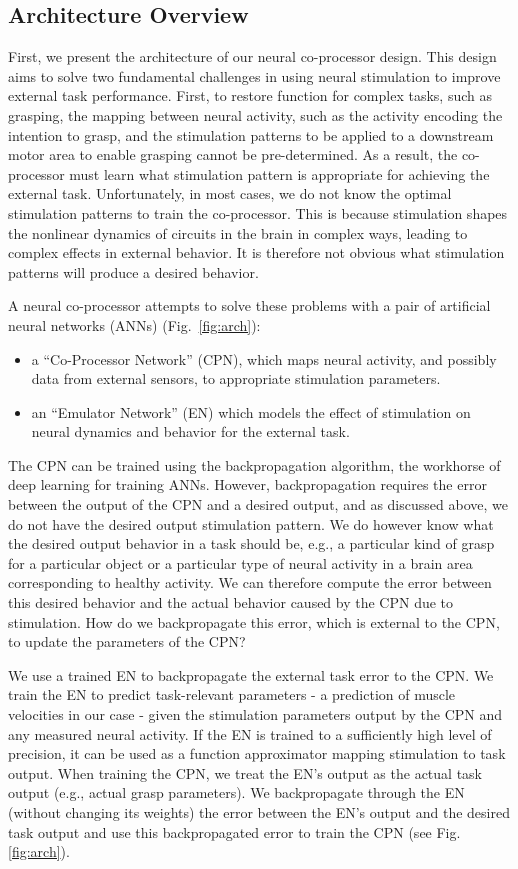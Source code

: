 \documentclass[12pt]{iopart}
\begin{document}
\subsection{Architecture Overview}
First, we present the architecture of our neural co-processor design. This design aims to solve two
fundamental challenges in using neural stimulation to improve external task performance.
First, to restore function for complex tasks, such as grasping, the mapping between
neural activity, such as the activity encoding the intention to grasp, and the stimulation patterns
to be applied to a downstream motor area to enable grasping cannot be pre-determined.
As a result, the co-processor must learn what stimulation pattern is appropriate for achieving the
external task. Unfortunately, in most cases, we do not know the optimal stimulation patterns to train
the co-processor. This is because stimulation shapes the nonlinear dynamics of circuits in the brain
in complex ways, leading to complex effects in external behavior. It is therefore not obvious what
stimulation patterns will produce a desired behavior. 

A neural co-processor attempts to solve these problems with a pair of artificial neural networks (ANNs)
(Fig.~\ref{fig:arch}):
\begin{itemize}
    \item a ``Co-Processor Network'' (CPN), which maps neural activity, and possibly
	      data from external sensors, to appropriate stimulation parameters.
    \item an ``Emulator Network'' (EN) which models the effect of stimulation on neural dynamics and
          behavior for the external task.
\end{itemize}

The CPN can be trained using the backpropagation algorithm, the workhorse of deep learning for training ANNs.
However, backpropagation requires the error between the output of the CPN and a desired output, and as
discussed above, we do not have the desired output stimulation pattern. We do however know what the desired
output behavior in a task should be, e.g., a particular kind of grasp for a particular object or a particular
type of neural activity in a brain area corresponding to healthy activity. We can therefore compute the error
between this desired behavior and the actual behavior caused by the CPN due to stimulation. How do we
backpropagate this error, which is external to the CPN, to update the parameters of the CPN?

We use a trained EN to backpropagate the external task error to the CPN. We train the EN to predict
task-relevant parameters - a prediction of muscle velocities in our case - given the stimulation
parameters output by the CPN and any measured neural activity. If the EN is trained to a sufficiently
high level of precision, it can be used as a function approximator mapping stimulation to task output.
When training the CPN, we treat the EN's output as the actual task output (e.g., actual grasp
parameters).  We backpropagate through the EN (without changing its weights) the error between
the EN's output and the desired task output and use this backpropagated error to train the
CPN (see Fig. \ref{fig:arch}). 
\end{document}
